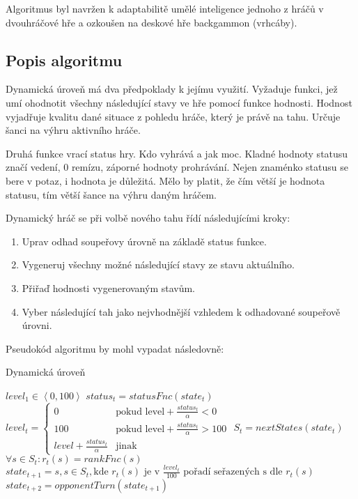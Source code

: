 Algoritmus byl navržen k adaptabilitě umělé inteligence jednoho z hráčů v dvouhráčové hře a ozkoušen na deskové hře backgammon (vrhcáby).

\subsection{Popis algoritmu}

Dynamická úroveň má dva předpoklady k jejímu využití. Vyžaduje funkci, jež umí ohodnotit všechny následující stavy ve hře pomocí funkce hodnosti. Hodnost vyjadřuje kvalitu dané situace z pohledu hráče, který je právě na tahu. Určuje šanci na výhru aktivního hráče.

Druhá funkce vrací status hry. Kdo vyhrává a jak moc. Kladné hodnoty statusu značí vedení, 0 remízu, záporné hodnoty prohrávání. Nejen znaménko statusu se bere v potaz, i hodnota je důležitá. Mělo by platit, že čím větší je hodnota statusu, tím větší šance na výhru daným hráčem.

Dynamický hráč se při volbě nového tahu řídí následujícími kroky:

\begin{enumerate}
	\item Uprav odhad soupeřovy úrovně na základě status funkce.
	\item Vygeneruj všechny možné následující stavy ze stavu aktuálního.
	\item Přiřaď hodnosti vygenerovaným stavům.
	\item Vyber následující tah jako nejvhodnější vzhledem k odhadované soupeřově úrovni.
\end{enumerate}

Pseudokód algoritmu by mohl vypadat následovně:

\begin{algorithm}
\caption{Dynamická úroveň}
\label{alg-dynlevel}
\begin{algorithmic}[1]
\State $level_1 \in \left\langle 0, 100 \right\rangle$
	 \State $status_t = statusFnc(state_t)$
	 \State $level_t = \begin{cases}
											  0 & \text{pokud level} + \frac{status_t}{\alpha} < 0 \\
												100 & \text{pokud level} + \frac{status_t}{\alpha} > 100 \\
												level + \frac{status_t}{\alpha}  & \text{jinak}
										 \end{cases}
						 $
   \State $S_t = nextStates(state_t)$
	 \State $\forall s \in S_t : r_t(s) = rankFnc(s)$
	 \State $state_{t+1} = s, s \in S_t, \text{kde } r_t(s) \text{ je v } \frac{level_t}{100} \text{ pořadí seřazených s dle } r_t(s)$
	 \State $state_{t+2} = opponentTurn(state_{t+1})$
\EndFor
\end{algorithmic}
\end{algorithm}

